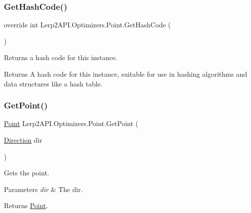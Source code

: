 \subsubsection{\texorpdfstring{Get\+Hash\+Code()}{GetHashCode()}}
{\footnotesize\ttfamily override int Lerp2\+A\+P\+I.\+Optimizers.\+Point.\+Get\+Hash\+Code (\begin{DoxyParamCaption}{ }\end{DoxyParamCaption})\hspace{0.3cm}{\ttfamily [inline]}}



Returns a hash code for this instance. 

\begin{DoxyReturn}{Returns}
A hash code for this instance, suitable for use in hashing algorithms and data structures like a hash table.
\end{DoxyReturn}
\mbox{\label{struct_lerp2_a_p_i_1_1_optimizers_1_1_point_aad820f00fe3f7401e98d38965e51f3a3}} 
\subsubsection{\texorpdfstring{Get\+Point()}{GetPoint()}}
{\footnotesize\ttfamily \hyperlink{struct_lerp2_a_p_i_1_1_optimizers_1_1_point}{Point} Lerp2\+A\+P\+I.\+Optimizers.\+Point.\+Get\+Point (\begin{DoxyParamCaption}\item[{\hyperlink{namespace_lerp2_a_p_i_1_1_optimizers_a159a6f85bec1076b8b34d5da86c7cafe}{Direction}}]{dir }\end{DoxyParamCaption})\hspace{0.3cm}{\ttfamily [inline]}}



Gets the point. 


\begin{DoxyParams}{Parameters}
{\em dir} & The dir.\\
\hline
\end{DoxyParams}
\begin{DoxyReturn}{Returns}
\hyperlink{struct_lerp2_a_p_i_1_1_optimizers_1_1_point}{Point}.
\end{DoxyReturn}
\mbox{\label{struct_lerp2_a_p_i_1_1_optimizers_1_1_point_aaa74bbc1982f994823c8caf9652eb829}} 
